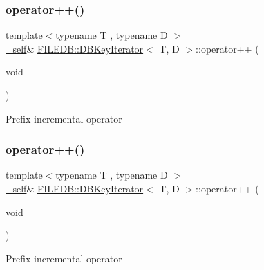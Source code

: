 \subsubsection{\texorpdfstring{operator++()}{operator++()}\hspace{0.1cm}{\footnotesize\ttfamily [1/4]}}
{\footnotesize\ttfamily template$<$typename T , typename D $>$ \\
\mbox{\hyperlink{classFILEDB_1_1DBKeyIterator_aaf7773c7a848ec6e04bc738dd794ace1}{\+\_\+self}}\& \mbox{\hyperlink{classFILEDB_1_1DBKeyIterator}{F\+I\+L\+E\+D\+B\+::\+D\+B\+Key\+Iterator}}$<$ T, D $>$\+::operator++ (\begin{DoxyParamCaption}\item[{void}]{ }\end{DoxyParamCaption})\hspace{0.3cm}{\ttfamily [inline]}}

Prefix incremental operator \mbox{\label{classFILEDB_1_1DBKeyIterator_a7816155cac741f3f82dafa73028f4307}} 
\subsubsection{\texorpdfstring{operator++()}{operator++()}\hspace{0.1cm}{\footnotesize\ttfamily [2/4]}}
{\footnotesize\ttfamily template$<$typename T , typename D $>$ \\
\mbox{\hyperlink{classFILEDB_1_1DBKeyIterator_aaf7773c7a848ec6e04bc738dd794ace1}{\+\_\+self}}\& \mbox{\hyperlink{classFILEDB_1_1DBKeyIterator}{F\+I\+L\+E\+D\+B\+::\+D\+B\+Key\+Iterator}}$<$ T, D $>$\+::operator++ (\begin{DoxyParamCaption}\item[{void}]{ }\end{DoxyParamCaption})\hspace{0.3cm}{\ttfamily [inline]}}

Prefix incremental operator \mbox{\label{classFILEDB_1_1DBKeyIterator_a364ac0414da6888e0b981f07b3239257}} 
